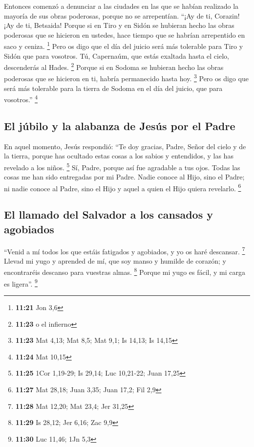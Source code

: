 \begin{paracol}{2}
 Entonces comenzó a denunciar a las ciudades en las que
se habían realizado la mayoría de sus obras poderosas, porque no se
arrepentían.  ``¡Ay de ti, Corazin! ¡Ay de ti, Betsaida!
Porque si en Tiro y en Sidón se hubieran hecho las obras poderosas que
se hicieron en ustedes, hace tiempo que se habrían arrepentido en saco y
ceniza. \footnote{\textbf{11:21} Jon 3,6}  Pero os digo
que el día del juicio será más tolerable para Tiro y Sidón que para
vosotros.  Tú, Capernaúm, que estás exaltada hasta el
cielo, descenderás al Hades. \footnote{\textbf{11:23} o el infierno}
Porque si en Sodoma se hubieran hecho las obras poderosas que se
hicieron en ti, habría permanecido hasta hoy. \footnote{\textbf{11:23}
  Mat 4,13; Mat 8,5; Mat 9,1; Is 14,13; Is 14,15}  Pero
os digo que será más tolerable para la tierra de Sodoma en el día del
juicio, que para vosotros.'' \footnote{\textbf{11:24} Mat 10,15}

\hypertarget{el-juxfabilo-y-la-alabanza-de-jesuxfas-por-el-padre}{%
\subsection{El júbilo y la alabanza de Jesús por el
Padre}\label{el-juxfabilo-y-la-alabanza-de-jesuxfas-por-el-padre}}

 En aquel momento, Jesús respondió: ``Te doy gracias,
Padre, Señor del cielo y de la tierra, porque has ocultado estas cosas a
los sabios y entendidos, y las has revelado a los niños. \footnote{\textbf{11:25}
  1Cor 1,19-29; Is 29,14; Luc 10,21-22; Juan 17,25}  Sí,
Padre, porque así fue agradable a tus ojos.  Todas las
cosas me han sido entregadas por mi Padre. Nadie conoce al Hijo, sino el
Padre; ni nadie conoce al Padre, sino el Hijo y aquel a quien el Hijo
quiera revelarlo. \footnote{\textbf{11:27} Mat 28,18; Juan 3,35; Juan
  17,2; Fil 2,9}

\hypertarget{el-llamado-del-salvador-a-los-cansados-y-agobiados}{%
\subsection{El llamado del Salvador a los cansados
\hspace{0pt}\hspace{0pt}y
agobiados}\label{el-llamado-del-salvador-a-los-cansados-y-agobiados}}

 ``Venid a mí todos los que estáis fatigados y agobiados,
y yo os haré descansar. \footnote{\textbf{11:28} Mat 12,20; Mat 23,4;
  Jer 31,25}  Llevad mi yugo y aprended de mí, que soy
manso y humilde de corazón; y encontraréis descanso para vuestras almas.
\footnote{\textbf{11:29} Is 28,12; Jer 6,16; Zac 9,9} 
Porque mi yugo es fácil, y mi carga es ligera''. \footnote{\textbf{11:30}
  Luc 11,46; 1Jn 5,3}


\end{paracol}
